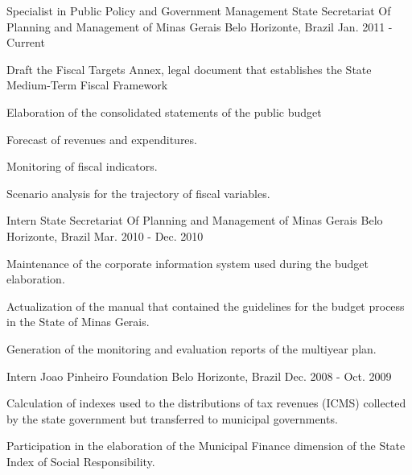 \begin{cventries}
  \cventry
    {Specialist in Public Policy and Government Management}
    {State Secretariat Of Planning and Management of Minas Gerais}
    {Belo Horizonte, Brazil}
    {Jan. 2011 - Current}
    {
      \begin{cvitems}
        \item {Draft the Fiscal Targets Annex, legal document that establishes the State Medium-Term Fiscal Framework}
        \item {Elaboration of the consolidated statements of the public budget}
        \item {Forecast of revenues and expenditures.}
        \item {Monitoring of fiscal indicators.}
        \item {Scenario analysis for the trajectory of fiscal variables.}
      \end{cvitems}
    }
  \cventry
    {Intern}
    {State Secretariat Of Planning and Management of Minas Gerais}
    {Belo Horizonte, Brazil}
    {Mar. 2010 - Dec. 2010}
    {
      \begin{cvitems}
        \item {Maintenance of the corporate information system used during the budget elaboration.}
        \item {Actualization of the manual that contained the guidelines for the budget process in the State of Minas Gerais.}
        \item {Generation of the monitoring and evaluation reports of the multiyear plan.}
      \end{cvitems}
    }
    \cventry
    {Intern}
    {Joao Pinheiro Foundation}
    {Belo Horizonte, Brazil}
    {Dec. 2008 - Oct. 2009}
    {
      \begin{cvitems}
        \item {Calculation of indexes used to the distributions of tax revenues (ICMS) collected by the state government but transferred to municipal governments.}
        \item {Participation in the elaboration of the Municipal Finance dimension of the State Index of Social Responsibility.}
      \end{cvitems}
    }  
\end{cventries}
